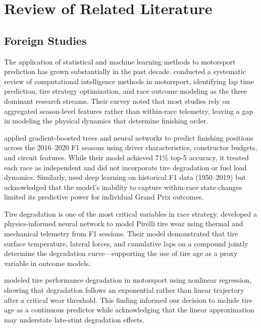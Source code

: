 \section{Review of Related Literature}

\subsection{Foreign Studies}

The application of statistical and machine learning methods to motorsport
prediction has grown substantially in the past decade.
\textcite{fister2021} conducted a systematic review of computational
intelligence methods in motorsport, identifying lap time prediction,
tire strategy optimization, and race outcome modeling as the three dominant
research streams. Their survey noted that most studies rely on aggregated
season-level features rather than within-race telemetry, leaving a gap in
modeling the physical dynamics that determine finishing order.

\textcite{kuhn2022f1} applied gradient-boosted trees and neural networks to
predict finishing positions across the 2016--2020 F1 seasons using driver
characteristics, constructor budgets, and circuit features. While their model
achieved 71\% top-5 accuracy, it treated each race as independent and did not
incorporate tire degradation or fuel load dynamics. Similarly,
\textcite{song2020} used deep learning on historical F1 data (1950--2019) but
acknowledged that the model's inability to capture within-race state changes
limited its predictive power for individual Grand Prix outcomes.

Tire degradation is one of the most critical variables in race strategy.
\textcite{perdomo2021tire} developed a physics-informed neural network to
model Pirelli tire wear using thermal and mechanical telemetry from F1
sessions. Their model demonstrated that tire surface temperature, lateral
forces, and cumulative laps on a compound jointly determine the degradation
curve---supporting the use of tire age as a proxy variable in outcome models.

\textcite{baldi2022} modeled tire performance degradation in motorsport using
nonlinear regression, showing that degradation follows an exponential rather
than linear trajectory after a critical wear threshold. This finding informed
our decision to include tire age as a continuous predictor while
acknowledging that the linear approximation may understate late-stint
degradation effects.

